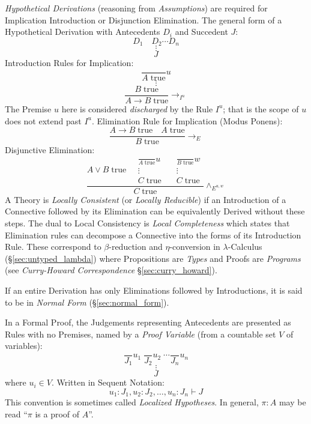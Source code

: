 \emph{Hypothetical Derivations} (reasoning from \emph{Assumptions})
are required for Implication Introduction or Disjunction
Elimination. The general form of a Hypothetical Derivation with
Antecedents $D_i$ and Succedent $J$:
\[
  D_1 \quad D_2 \cdots D_n
\]\[
  \vdots
\]\[
  J
\]
Introduction Rules for Implication:
\[
  {
    \frac{}
    {A\;\mathrm{true}}
  } u
\]\[
  \vdots
\]\[
  {
    \frac{B\;\mathrm{true}}
    {A \rightarrow B\;\mathrm{true}}
  } \rightarrow_{I^u}
\]
The Premise $u$ here is considered \emph{discharged} by the Rule
$I^u$; that is the scope of $u$ does not extend past $I^u$.
Elimination Rule for Implication (Modus Ponens):
\[
  {
    \frac{A \rightarrow B\;\mathrm{true} \quad A\;\mathrm{true}}
    {B\;\mathrm{true}}
  } \rightarrow_{E}
\]
Disjunctive Elimination:
\[
  \frac{
  A \vee B\;\mathrm{true} \quad
  \begin{matrix}
    {
      \frac{}
      {A\;\mathrm{true}}
    }u \\
    \vdots \\
    C\;\mathrm{true}
  \end{matrix}
  \quad
  \begin{matrix}
    {
      \frac{}
      {B\;\mathrm{true}}
    }w \\
    \vdots \\
    C\;\mathrm{true}
  \end{matrix}
  }{ C\;\mathrm{true}}\wedge_{E^{u,w}}
\]
A Theory is \emph{Locally Consistent} (or \emph{Locally Reducible}) if
an Introduction of a Connective followed by its Elimination can be
equivalently Derived without these steps. The dual to Local
Consistency is \emph{Local Completeness} which states that Elimination
rules can decompose a Connective into the forms of its Introduction
Rule. These correspond to $\beta$-reduction and $\eta$-conversion in
$\lambda$-Calculus (\S\ref{sec:untyped_lambda}) where Propositions
are \emph{Types} and Proofs are \emph{Programs} (see
\emph{Curry-Howard Correspondence} \S\ref{sec:curry_howard}).

If an entire Derivation has only Eliminations followed by
Introductions, it is said to be in \emph{Normal Form}
(\S\ref{sec:normal_form}).

In a Formal Proof, the Judgements representing Antecedents are
presented as Rules with no Premises, named by a \emph{Proof Variable}
(from a countable set $V$ of variables):
\[
  \frac{}{J_1}u_1 \; \frac{}{J_2}u_2 \; \cdots \frac{}{J_n}u_n
\]\[
  \vdots
\]\[
  J
\]
where $u_i \in V$. Written in Sequent Notation:
\[
  u_1:J_1, u_2:J_2, \ldots, u_n:J_n \vdash J
\]
This convention is sometimes called \emph{Localized Hypotheses}. In
general, $\pi : A$ may be read ``$\pi$ is a proof of $A$''.



